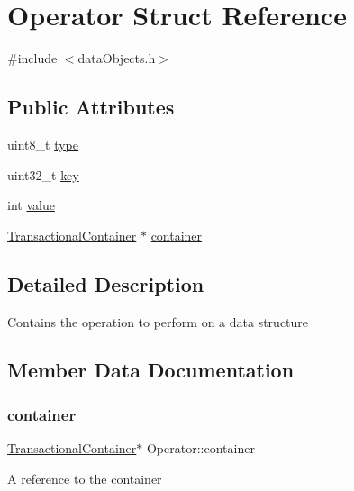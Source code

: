 \hypertarget{structOperator}{}\section{Operator Struct Reference}
\label{structOperator}


{\ttfamily \#include $<$data\+Objects.\+h$>$}

\subsection*{Public Attributes}
\begin{DoxyCompactItemize}
\item 
uint8\+\_\+t \hyperlink{structOperator_a080f62070dd613b378d51055e10c6666}{type}
\item 
uint32\+\_\+t \hyperlink{structOperator_a3badf2c2c57572925e2997feb6c9cc48}{key}
\item 
int \hyperlink{structOperator_a1fc60545d6d6532c156eab3656eb7a32}{value}
\item 
\hyperlink{classTransactionalContainer}{Transactional\+Container} $\ast$ \hyperlink{structOperator_a62de62f2e42640736cadf982fea2d9c3}{container}
\end{DoxyCompactItemize}


\subsection{Detailed Description}
Contains the operation to perform on a data structure 

\subsection{Member Data Documentation}
\mbox{\label{structOperator_a62de62f2e42640736cadf982fea2d9c3}} 
\subsubsection{\texorpdfstring{container}{container}}
{\footnotesize\ttfamily \hyperlink{classTransactionalContainer}{Transactional\+Container}$\ast$ Operator\+::container}

A reference to the container \mbox{\label{structOperator_a3badf2c2c57572925e2997feb6c9cc48}} 
